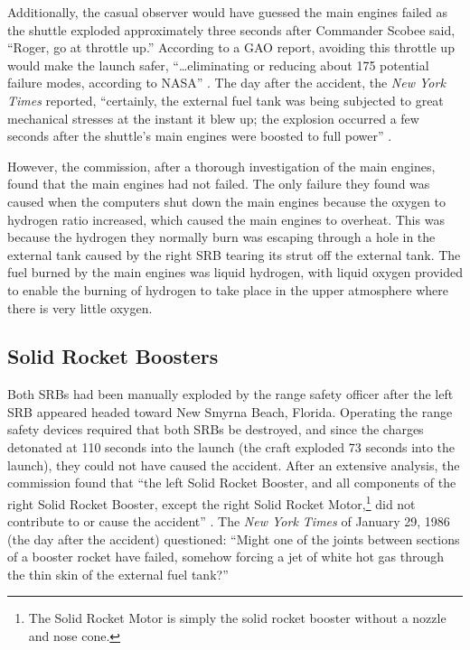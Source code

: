 Additionally, the casual observer would have guessed the main engines failed as the shuttle exploded approximately three seconds after Commander Scobee said, ``Roger, go at throttle up.'' According to a GAO report, avoiding this throttle up would make the launch safer, ``\ldots eliminating or reducing about 175 potential failure modes, according to NASA'' \cite{gao89}. The day after the accident, the {\em New York Times} reported, ``certainly, the external fuel tank was being subjected to great mechanical stresses at the instant it blew up; the explosion occurred a few seconds after the shuttle's main engines were boosted to full power'' \cite[p. A4]{nytexternal}.

However, the commission, after a thorough investigation of the main engines, found that the main engines had not failed. The only failure they found was caused when the computers shut down the main engines because the oxygen to hydrogen ratio increased, which caused the main engines to overheat. This was because the hydrogen they normally burn was escaping through a hole in the external tank caused by the right SRB tearing its strut off the external tank. The fuel burned by the main engines was liquid hydrogen, with liquid oxygen provided to enable the burning of hydrogen to take place in the upper atmosphere where there is very little oxygen.

\subsection{Solid Rocket Boosters}

Both SRBs had been manually exploded by the range safety officer after the left SRB appeared headed toward New Smyrna Beach, Florida. Operating the range safety devices required that both SRBs be destroyed, and since the charges detonated at 110 seconds into the launch (the craft exploded 73 seconds into the launch), they could not have caused the accident. After an extensive analysis, the commission found that ``the left Solid Rocket Booster, and all components of the right Solid Rocket Booster, except the right Solid Rocket Motor,\footnote{The Solid Rocket Motor is simply the solid rocket booster without a nozzle and nose cone.} did not contribute to or cause the accident'' \cite[vol 1, p. 53]{rogers}. The {\em New York Times} of January 29, 1986 (the day after the accident) questioned: ``Might one of the joints between sections of a booster rocket have failed, somehow forcing a jet of white hot gas through the thin skin of the external fuel tank?'' \cite{nytexternal}

